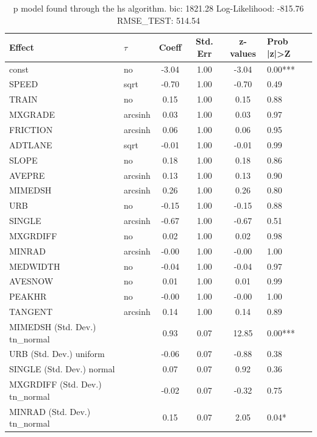 \begin{table}
	\caption{p model found through the hs algorithm. bic: 1821.28 Log-Likelihood: -815.76 RMSE_TEST: 514.54}
	\begin{center}
		\begin{tabular}{|l|l|c|c|c|l|}
			\hline
			Effect & $\tau$ & Coeff & Std. Err & z-values & Prob |z|>Z \\
			\hline
			const & no & -3.04 & 1.00 & -3.04 & 0.00*** \\
			\hline
			SPEED & sqrt & -0.70 & 1.00 & -0.70 & 0.49 \\
			\hline
			TRAIN & no & 0.15 & 1.00 & 0.15 & 0.88 \\
			\hline
			MXGRADE & arcsinh & 0.03 & 1.00 & 0.03 & 0.97 \\
			\hline
			FRICTION & arcsinh & 0.06 & 1.00 & 0.06 & 0.95 \\
			\hline
			ADTLANE & sqrt & -0.01 & 1.00 & -0.01 & 0.99 \\
			\hline
			SLOPE & no & 0.18 & 1.00 & 0.18 & 0.86 \\
			\hline
			AVEPRE & arcsinh & 0.13 & 1.00 & 0.13 & 0.90 \\
			\hline
			MIMEDSH & arcsinh & 0.26 & 1.00 & 0.26 & 0.80 \\
			\hline
			URB & no & -0.15 & 1.00 & -0.15 & 0.88 \\
			\hline
			SINGLE & arcsinh & -0.67 & 1.00 & -0.67 & 0.51 \\
			\hline
			MXGRDIFF & no & 0.02 & 1.00 & 0.02 & 0.98 \\
			\hline
			MINRAD & arcsinh & -0.00 & 1.00 & -0.00 & 1.00 \\
			\hline
			MEDWIDTH & no & -0.04 & 1.00 & -0.04 & 0.97 \\
			\hline
			AVESNOW & no & 0.01 & 1.00 & 0.01 & 0.99 \\
			\hline
			PEAKHR & no & -0.00 & 1.00 & -0.00 & 1.00 \\
			\hline
			TANGENT & arcsinh & 0.14 & 1.00 & 0.14 & 0.89 \\
			\hline
			MIMEDSH (Std. Dev.) tn_normal &  & 0.93 & 0.07 & 12.85 & 0.00*** \\
			\hline
			URB (Std. Dev.) uniform &  & -0.06 & 0.07 & -0.88 & 0.38 \\
			\hline
			SINGLE (Std. Dev.) normal &  & 0.07 & 0.07 & 0.92 & 0.36 \\
			\hline
			MXGRDIFF (Std. Dev.) tn_normal &  & -0.02 & 0.07 & -0.32 & 0.75 \\
			\hline
			MINRAD (Std. Dev.) tn_normal &  & 0.15 & 0.07 & 2.05 & 0.04* \\

\end{tabular}
\end{center}
\end{table}
